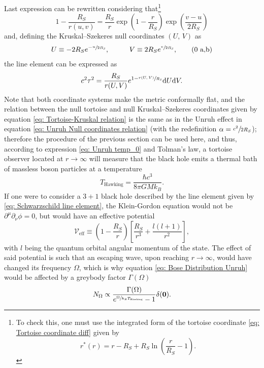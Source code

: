 Last expression can be rewritten considering that\footnote{To check this, one must use the integrated form of the tortoise coordinate \ref{eq: Tortoise coordinate diff} given by $$r^*(r)=r-R_S+R_S\ln\left(\frac{r}{R_S}-1\right).$$}
\begin{equation}
	1-\frac{R_S}{r\left(u,v\right)}=\frac{R_S}{r}\exp{\left(1-\frac{r}{R_S}\right)}\exp{\left(\frac{v-u}{2R_S}\right)}
\end{equation} 
and, defining the Kruskal–Szekeres null coordinates $(U,\,V)$ as
\begin{subequations}\label{eq: Tortoise-Kruskal relation}
	\begin{gather}
		U\equiv -2R_Se^{-\sfrac{u}{2R_S}},\hspace{1.0cm}V\equiv 2R_Se^{\sfrac{v}{2R_S}},\tag{\theequation \,\,a,b}
	\end{gather}
\end{subequations}
the line element can be expressed as
\begin{equation}
	c^2\tau^2=\frac{R_S}{r(U,V)}e^{1-\sfrac{r(U,V)}{R_S}}\text{d} U\text{d} V.
\end{equation}
Note that both coordinate systems make the metric conformally flat, and the relation between the null tortoise and null Kruskal–Szekeres coordinates given by equation \ref{eq: Tortoise-Kruskal relation} is the same as in the Unruh effect in equation \ref{eq: Unruh Null coordinates relation} (with the redefinition  $\alpha=\sfrac{c^2}{2R_S}$); therefore the procedure of the previous section can be used here, and thus, according to expression \ref{eq: Unruh temp_0} and Tolman's law, a tortoise observer located at $r\to\infty$ will measure that the black hole emits a thermal bath of massless boson particles at a temperature 
\begin{equation}
	T_{\text{Hawking}}=\frac{\hbar c^3}{8\pi GMk_B}.
\end{equation}
If one were to consider a $3+1$ black hole \cite[sec.\,9.1.4]{QuantumEffects} described by the line element given by \ref{eq: Schwarzschild line element}, the Klein-Gordon equation would not be $\partial^\mu\partial_\nu\phi=0$, but would have an effective potential
\begin{equation}
	\mathcal{V}_{\text{eff}}\equiv\left(1-\frac{R_S}{r}\right)\left[\frac{R_S}{r^3}+\frac{l(l+1)}{r^2}\right],
\end{equation}
with $l$ being the quantum orbital angular momentum of the state. The effect of said potential is such that an escaping wave, upon reaching $r\to\infty$, would have changed its frequency $\Omega$, which is why equation \ref{eq: Bose Distribution Unruh} would be affected by a greybody factor $\Gamma(\Omega)$ 
\begin{equation}
	N_\Omega\propto\frac{\Gamma(\Omega)}{e^{\sfrac{\Omega}{k_BT_{\text{Hawking}}}}-1}\delta(\mathbf{0}).
\end{equation}
\newpage
